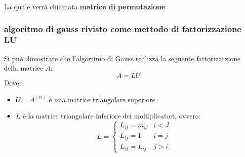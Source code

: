 La quale verrà chiamata \textbf{matrice di permutazione}

\subsubsection{algoritmo di gauss rivisto come mettodo di fattorizzazione LU}
Si può dimostrare che l'algortimo di Gauss realizza la seguente fattorizzazione della matrice $A$:
\[
        A = LU
\]
Dove:
\begin{itemize}
    \item $U=A^{(n)}$ è una matrice triangolare superiore
    \item $L$ è la matrice triangolare inferiore dei moltiplicatori, ovvero:
    \[
        L = \begin{cases}
            L_{ij} = m_{ij} & i<J\\
            L_{ij} = 1 & i=j\\
            L_{ij} = L_{ij} & j>i
        \end{cases}    
    \]
\end{itemize}


